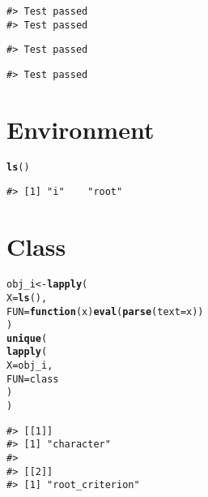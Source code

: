 \documentclass{article}\usepackage[]{graphicx}\usepackage[]{color}
\makeatletter
\newcommand{\hlstd}[1]{\textcolor[rgb]{0.345,0.345,0.345}{#1}}%
\newcommand{\hlkwa}[1]{\textcolor[rgb]{0.161,0.373,0.58}{\textbf{#1}}}%
\newcommand{\hlkwb}[1]{\textcolor[rgb]{0.69,0.353,0.396}{#1}}%
\newcommand{\hlkwc}[1]{\textcolor[rgb]{0.333,0.667,0.333}{#1}}%
\newcommand{\hlkwd}[1]{\textcolor[rgb]{0.737,0.353,0.396}{\textbf{#1}}}%
\newenvironment{kframe}{%
 \def\at@end@of@kframe{}%
 \ifinner\ifhmode%
  \def\at@end@of@kframe{\end{minipage}}%
  \begin{minipage}{\columnwidth}%
 \fi\fi%
 \def\FrameCommand##1{\hskip\@totalleftmargin \hskip-\fboxsep
 \colorbox{shadecolor}{##1}\hskip-\fboxsep
     \hskip-\linewidth \hskip-\@totalleftmargin \hskip\columnwidth}%
 \MakeFramed {\advance\hsize-\width
   \@totalleftmargin\z@ \linewidth\hsize
   \@setminipage}}%
 {\par\unskip\endMakeFramed%
 \at@end@of@kframe}
\newenvironment{knitrout}{}{} %
\makeatother
\begin{document}
\begin{knitrout}
\begin{kframe}
{\ttfamily\noindent\itshape\color{messagecolor}{\#> test-linearAlgebra-z 1}}\begin{verbatim}
#> Test passed 
#> Test passed
\end{verbatim}


{\ttfamily\noindent\itshape\color{messagecolor}{\#> test-linearAlgebra-z 2}}\begin{verbatim}
#> Test passed
\end{verbatim}


{\ttfamily\noindent\itshape\color{messagecolor}{\#> test-linearAlgebra-z 3}}\begin{verbatim}
#> Test passed
\end{verbatim}


{\ttfamily\noindent\itshape\color{messagecolor}{\#> This package was developed by Ivan Jacob Agaloos Pesigan.}}\end{kframe}
\end{knitrout}

\section*{Environment}

\begin{knitrout}
\color{fgcolor}\begin{kframe}
\begin{alltt}
\hlkwd{ls}\hlstd{()}
\end{alltt}
\begin{verbatim}
#> [1] "i"    "root"
\end{verbatim}
\end{kframe}
\end{knitrout}

\section*{Class}

\begin{knitrout}
\color{fgcolor}\begin{kframe}
\begin{alltt}
\hlstd{obj_i} \hlkwb{<-} \hlkwd{lapply}\hlstd{(}
  \hlkwc{X} \hlstd{=} \hlkwd{ls}\hlstd{(),}
  \hlkwc{FUN} \hlstd{=} \hlkwa{function}\hlstd{(}\hlkwc{x}\hlstd{)} \hlkwd{eval}\hlstd{(}\hlkwd{parse}\hlstd{(}\hlkwc{text} \hlstd{= x))}
\hlstd{)}
\hlkwd{unique}\hlstd{(}
  \hlkwd{lapply}\hlstd{(}
    \hlkwc{X} \hlstd{= obj_i,}
    \hlkwc{FUN} \hlstd{= class}
  \hlstd{)}
\hlstd{)}
\end{alltt}
\begin{verbatim}
#> [[1]]
#> [1] "character"
#> 
#> [[2]]
#> [1] "root_criterion"
\end{verbatim}
\end{kframe}
\end{knitrout}

\nocite{R-2021}

\printbibliography
\end{document}
